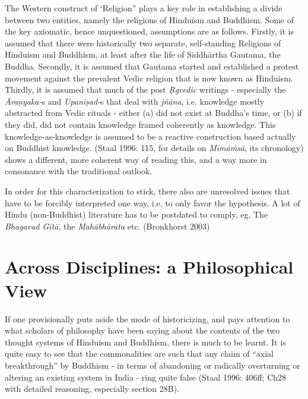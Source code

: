 The Western construct of ‘Religion” plays a key role in establishing a divide between two entities, namely the religions of Hinduism and Buddhism. Some of the key axiomatic, hence unquestioned, assumptions are as follows. Firstly, it is assumed that there were historically two separate, self-standing Religions of Hinduism and Buddhism, at least after the life of Siddhārtha Gautama, the Buddha. Secondly, it is assumed that Gautama started and established a protest movement against the prevalent Vedic religion that is now known as Hinduism. Thirdly, it is assumed that much of the post \textit{Ṛgvedic} writings - especially the \textit{Āraṇyaka-}s and \textit{Upaniṣad-}s that deal with \textit{jñāna}, i.e. knowledge mostly abstracted from Vedic rituals - either (a) did not exist at Buddha’s time, or (b) if they did, did not contain knowledge framed coherently as knowledge. This knowledge-as-knowledge is assumed to be a reactive construction based actually on Buddhist knowledge. (Staal 1996: 115, for details on \textit{Mīmāṁsā}, its chronology) shows a different, more coherent way of reading this, and a way more in consonance with the traditional outlook.

In order for this characterization to stick, there also are unresolved issues that have to be forcibly interpreted one way, i.e. to only favor the hypothesis. A lot of Hindu (non-Buddhist) literature has to be postdated to comply, eg. The \textit{Bhagavad Gītā}, the \textit{Mahābhārata} etc. (Bronkhorst 2003)


\section*{Across Disciplines: a Philosophical View}

If one provisionally puts aside the mode of historicizing, and pays attention to what scholars of philosophy have been saying about the contents of the two thought systems of Hinduism and Buddhism, there is much to be learnt. It is quite easy to see that the commonalities are such that any claim of “axial breakthrough” by Buddhism - in terms of abandoning or radically overturning or altering an existing system in India - ring quite false (Staal 1996: 406ff; Ch28 with detailed reasoning, especially section 28B).

